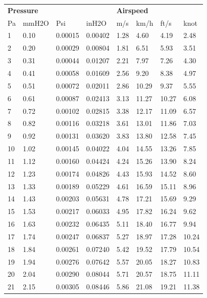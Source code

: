 \documentclass[12pt,a4paper,twoside]{article}
\begin{document}
\begin{center}
  \begin{longtable}{l l l l | l l l l}
    \hline
    \multicolumn{4}{l}{\textbf{Pressure}} & \multicolumn{4}{l}{\textbf{Airspeed}} \\ 
    Pa& mmH2O & Psi & inH2O & m/s & km/h & ft/s & knot\\ \hline
    \endhead 
1 & 0.10 & 0.00015 & 0.00402 & 1.28 & 4.60 & 4.19 & 2.48 \\ \hline
2 & 0.20 & 0.00029 & 0.00804 & 1.81 & 6.51 & 5.93 & 3.51 \\ \hline
3 & 0.31 & 0.00044 & 0.01207 & 2.21 & 7.97 & 7.26 & 4.30 \\ \hline
4 & 0.41 & 0.00058 & 0.01609 & 2.56 & 9.20 & 8.38 & 4.97 \\ \hline
5 & 0.51 & 0.00072 & 0.02011 & 2.86 & 10.29 & 9.37 & 5.55 \\ \hline
6 & 0.61 & 0.00087 & 0.02413 & 3.13 & 11.27 & 10.27 & 6.08 \\ \hline
7 & 0.72 & 0.00102 & 0.02815 & 3.38 & 12.17 & 11.09 & 6.57 \\ \hline
8 & 0.82 & 0.00116 & 0.03218 & 3.61 & 13.01 & 11.86 & 7.03 \\ \hline
9 & 0.92 & 0.00131 & 0.03620 & 3.83 & 13.80 & 12.58 & 7.45 \\ \hline
10 & 1.02 & 0.00145 & 0.04022 & 4.04 & 14.55 & 13.26 & 7.85 \\ \hline
11 & 1.12 & 0.00160 & 0.04424 & 4.24 & 15.26 & 13.90 & 8.24 \\ \hline
12 & 1.23 & 0.00174 & 0.04826 & 4.43 & 15.93 & 14.52 & 8.60 \\ \hline
13 & 1.33 & 0.00189 & 0.05229 & 4.61 & 16.59 & 15.11 & 8.96 \\ \hline
14 & 1.43 & 0.00203 & 0.05631 & 4.78 & 17.21 & 15.69 & 9.29 \\ \hline
15 & 1.53 & 0.00217 & 0.06033 & 4.95 & 17.82 & 16.24 & 9.62 \\ \hline
16 & 1.63 & 0.00232 & 0.06435 & 5.11 & 18.40 & 16.77 & 9.94 \\ \hline
17 & 1.74 & 0.00247 & 0.06837 & 5.27 & 18.97 & 17.28 & 10.24 \\ \hline
18 & 1.84 & 0.00261 & 0.07240 & 5.42 & 19.52 & 17.79 & 10.54 \\ \hline
19 & 1.94 & 0.00276 & 0.07642 & 5.57 & 20.05 & 18.27 & 10.83 \\ \hline
20 & 2.04 & 0.00290 & 0.08044 & 5.71 & 20.57 & 18.75 & 11.11 \\ \hline
21 & 2.15 & 0.00305 & 0.08446 & 5.86 & 21.08 & 19.21 & 11.38 \\ \hline

\end{longtable}
\end{center}
\end{document}
